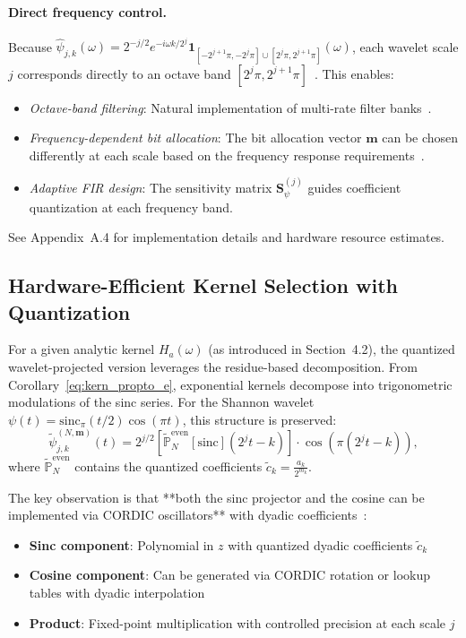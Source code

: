 \paragraph{Direct frequency control.} Because $\widehat{\psi}_{j,k}(\omega) = 2^{-j/2} e^{-i\omega k/2^j} \mathbf{1}_{[-2^{j+1}\pi, -2^j\pi] \cup [2^j\pi, 2^{j+1}\pi]}(\omega)$, each wavelet scale $j$ corresponds directly to an octave band $[2^j\pi, 2^{j+1}\pi]$~\cite{Walter1992}. This enables:
\begin{itemize}
\item \emph{Octave-band filtering}: Natural implementation of multi-rate filter banks~\cite{Crochiere1983}.
\item \emph{Frequency-dependent bit allocation}: The bit allocation vector $\mathbf{m}$ can be chosen differently at each scale based on the frequency response requirements~\cite{JohnstonEtAl1997}.
\item \emph{Adaptive FIR design}: The sensitivity matrix $\mathbf{S}_{\psi}^{(j)}$ guides coefficient quantization at each frequency band.
\end{itemize}

See Appendix~A.4 for implementation details and hardware resource estimates.

\subsection{Hardware-Efficient Kernel Selection with Quantization}

For a given analytic kernel $H_a(\omega)$ (as introduced in Section~4.2), the quantized wavelet-projected version leverages the residue-based decomposition. From Corollary~\ref{eq:kern_propto_e}, exponential kernels decompose into trigonometric modulations of the sinc series. For the Shannon wavelet $\psi(t) = \text{sinc}_\pi(t/2)\cos(\pi t)$, this structure is preserved:
\begin{equation}
\widetilde{\psi}_{j,k}^{(N,\mathbf{m})}(t) = 2^{j/2} \left[\widetilde{\mathbb{P}}_N^{\text{even}}[\text{sinc}](2^{j}t - k)\right] \cdot \cos(\pi(2^j t - k)),
\label{eq:quantized_wavelet_kernel}
\end{equation}
where $\widetilde{\mathbb{P}}_N^{\text{even}}$ contains the quantized coefficients $\widetilde{c}_k = \frac{a_k}{2^{m_k}}$.

The key observation is that **both the sinc projector and the cosine can be implemented via CORDIC oscillators** with dyadic coefficients~\cite{Volder1959, Andraka1998}:
\begin{itemize}
\item \textbf{Sinc component}: Polynomial in $z$ with quantized dyadic coefficients $\widetilde{c}_k$
\item \textbf{Cosine component}: Can be generated via CORDIC rotation or lookup tables with dyadic interpolation
\item \textbf{Product}: Fixed-point multiplication with controlled precision at each scale $j$
\end{itemize}

